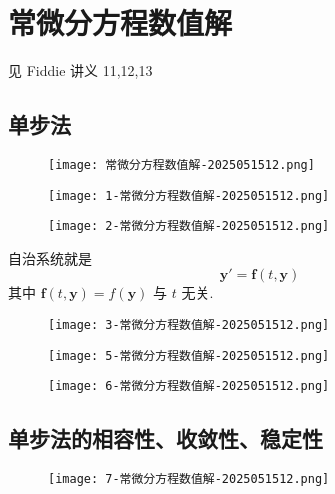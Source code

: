 \section{常微分方程数值解}

见 Fiddie 讲义 11,12,13

\subsection{单步法}

\begin{figure}[H]
\centering
\texttt{[image: 常微分方程数值解-2025051512.png]}
\label{}
\end{figure}

\begin{figure}[H]
\centering
\texttt{[image: 1-常微分方程数值解-2025051512.png]}
\label{}
\end{figure}
\begin{figure}[H]
\centering
\texttt{[image: 2-常微分方程数值解-2025051512.png]}
\label{}
\end{figure}

自治系统就是
\[
\boldsymbol{y}'=\boldsymbol{f}(t,\boldsymbol{y})
\]
其中 $\boldsymbol{f}(t,\boldsymbol{y})=f(\boldsymbol{y})$ 与 $t$ 无关.

\begin{figure}[H]
\centering
\texttt{[image: 3-常微分方程数值解-2025051512.png]}
\label{}
\end{figure}

\begin{figure}[H]
\centering
\texttt{[image: 5-常微分方程数值解-2025051512.png]}
\label{}
\end{figure}

\begin{figure}[H]
\centering
\texttt{[image: 6-常微分方程数值解-2025051512.png]}
\label{}
\end{figure}

\subsection{单步法的相容性、收敛性、稳定性}

\begin{figure}[H]
\centering
\texttt{[image: 7-常微分方程数值解-2025051512.png]}
\label{}
\end{figure}


